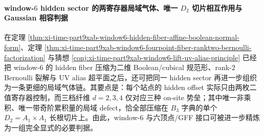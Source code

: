 \paragraph{window-\texorpdfstring{$6$}{6} hidden sector 的两寄存器局域气体、唯一 \texorpdfstring{$D_2$}{D2} 切片相互作用与 Gaussian 相容判据}
在定理 \ref{thm:xi-time-part9xab-window6-hidden-fiber-affine-boolean-normal-form}、定理 \ref{thm:xi-time-part9xab-window6-fourpoint-fiber-ranktwo-bernoulli-factorization} 与猜想 \ref{conj:xi-time-part9xab-window6-lift-uv-alias-principle} 已经把 window-\(6\) 的 hidden fiber 压缩为二维 Boolean/cubical 规范形、rank-\(2\) Bernoulli 裂解与 UV alias 超平面之后，还可把同一 hidden sector 再进一步组织为一条更细的局域气体链。其要点是：每个站点的 hidden offset 实际只由两枚二值寄存器控制，而三档纤维 \(d=2,3,4\) 仅对应三种 on-site 势垒；其中唯一非乘积、唯一带奇阶累积量的局域 defect，恰全部压缩在 \(B_3\) 字典的单个 \(D_2=A_1\times A_1\) 长根切片上。由此，window-\(6\) 与六顶点/GFF 接口可被进一步精炼为一组完全显式的必要判据。

